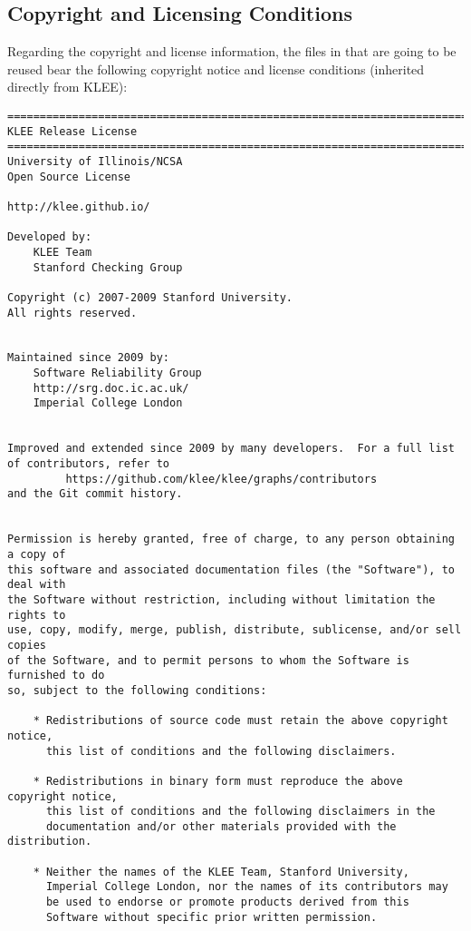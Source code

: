 \subsection{Copyright and Licensing Conditions}

Regarding the copyright and license information, the files in \SEMU that are going to be reused bear the following copyright notice and license conditions (inherited directly from KLEE):

\begin{lstlisting}[language={}]
==============================================================================
KLEE Release License
==============================================================================
University of Illinois/NCSA
Open Source License

http://klee.github.io/

Developed by:
    KLEE Team
    Stanford Checking Group

Copyright (c) 2007-2009 Stanford University.
All rights reserved.


Maintained since 2009 by:
    Software Reliability Group
    http://srg.doc.ic.ac.uk/
    Imperial College London


Improved and extended since 2009 by many developers.  For a full list
of contributors, refer to
         https://github.com/klee/klee/graphs/contributors
and the Git commit history.


Permission is hereby granted, free of charge, to any person obtaining a copy of
this software and associated documentation files (the "Software"), to deal with
the Software without restriction, including without limitation the rights to
use, copy, modify, merge, publish, distribute, sublicense, and/or sell copies
of the Software, and to permit persons to whom the Software is furnished to do
so, subject to the following conditions:

    * Redistributions of source code must retain the above copyright notice,
      this list of conditions and the following disclaimers.

    * Redistributions in binary form must reproduce the above copyright notice,
      this list of conditions and the following disclaimers in the
      documentation and/or other materials provided with the distribution.

    * Neither the names of the KLEE Team, Stanford University,
      Imperial College London, nor the names of its contributors may
      be used to endorse or promote products derived from this
      Software without specific prior written permission.


\end{lstlisting}
